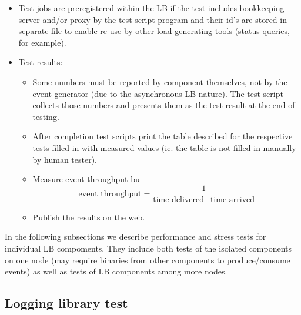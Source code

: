 \begin{itemize}
\item Test jobs are preregistered within the LB if the test includes
bookkeeping server and/or proxy by the test script program and their id's are
stored in separate file to enable re-use by other load-generating tools (status
queries, for example).

\item Test results:
   \begin{itemize}
   \item Some numbers must be reported by component themselves, not by
      the event generator (due to the asynchronous LB nature). The
      test script collects those numbers and presents them as the test
      result at the end of testing.

    \item After completion test scripts print the table described for the
      respective tests filled in with measured values (ie. the table
      is not filled in manually by human tester).
 
    \item Measure event throughput bu
    \[ \mbox{event\_throughput} = \frac{1}{\mbox{time\_delivered} - \mbox{time\_arrived}} \]

    \item Publish the results on the web.
    \end{itemize}
%
\end{itemize}

In the following subsections we describe performance and stress tests for
individual LB compoments.  They include both tests of the isolated components
on one node (may require binaries from other components to produce/consume
events) as well as tests of LB components among more nodes.


\subsection{Logging library test}

